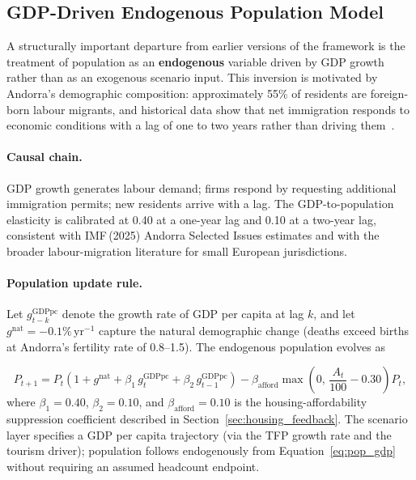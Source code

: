 \documentclass{article}
\begin{document}
\subsection{GDP-Driven Endogenous Population Model}
\label{sec:gdp_pop_model}

A structurally important departure from earlier versions of the framework is the
treatment of population as an \textbf{endogenous} variable driven by GDP growth
rather than as an exogenous scenario input. This inversion is motivated by
Andorra's demographic composition: approximately 55\% of residents are
foreign-born labour migrants, and historical data show that net immigration
responds to economic conditions with a lag of one to two years rather than
driving them~\cite{imf2025andorra,worldbank2024}.

\paragraph{Causal chain.}
GDP growth generates labour demand; firms respond by requesting additional
immigration permits; new residents arrive with a lag. The GDP-to-population
elasticity is calibrated at 0.40 at a one-year lag and 0.10 at a two-year lag,
consistent with IMF\,(2025) Andorra Selected Issues estimates and with the
broader labour-migration literature for small European jurisdictions.

\paragraph{Population update rule.}
Let $g^\text{GDPpc}_{t-k}$ denote the growth rate of GDP per capita at lag
$k$, and let $g^\text{nat}=-0.1\%\,\text{yr}^{-1}$ capture the natural
demographic change (deaths exceed births at Andorra's fertility rate of
0.8--1.5). The endogenous population evolves as

\begin{equation}
  P_{t+1} = P_t\!\left(1 + g^\text{nat}
              + \beta_1\, g^\text{GDPpc}_{t}
              + \beta_2\, g^\text{GDPpc}_{t-1}\right)
            - \beta_\text{afford}
              \max\!\left(0,\,\frac{A_t}{100} - 0.30\right)P_t,
  \label{eq:pop_gdp}
\end{equation}
where $\beta_1=0.40$, $\beta_2=0.10$, and $\beta_\text{afford}=0.10$ is the
housing-affordability suppression coefficient described in
Section~\ref{sec:housing_feedback}. The scenario layer specifies a GDP per
capita trajectory (via the TFP growth rate and the tourism driver); population
follows endogenously from Equation~\eqref{eq:pop_gdp} without requiring an
assumed headcount endpoint.
\end{document}
